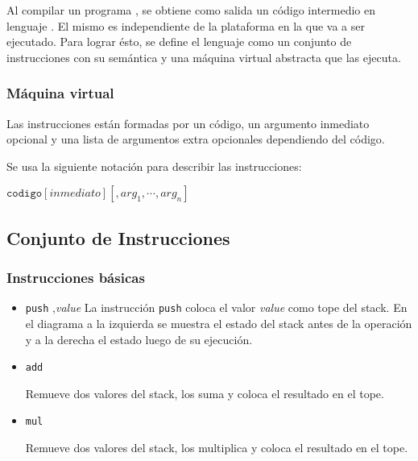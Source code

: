   Al compilar un programa \frob{}, se obtiene como salida un código
intermedio en lenguaje \alf{}.
  El mismo es independiente de la plataforma en la que va a ser ejecutado.
  Para lograr ésto, se define el lenguaje como un conjunto de instrucciones
con su semántica y una máquina virtual abstracta que las ejecuta.



\subsubsection{Máquina virtual}



  Las instrucciones están formadas por un código, un argumento inmediato
  opcional y una lista de argumentos extra opcionales dependiendo del
  código.

  Se usa la siguiente notación para describir las instrucciones:
  \begin{center}
    $\texttt{codigo} [\textit{inmediato}] [, {arg}_1, \dotsb, {arg}_n ]$
  \end{center}


\subsection{Conjunto de Instrucciones}

\subsubsection{Instrucciones básicas}

\begin{itemize}

\item {
    \texttt{push} ,\textit{value}
    La instrucción \texttt{push} coloca el
    valor \textit{value} como tope del stack.
    En el diagrama a la izquierda se muestra el estado del stack antes
    de la operación y a la derecha el estado luego de su ejecución.

    
}
\item {
    \texttt{add}

      Remueve dos valores del stack, los suma y coloca el resultado en
    el tope.

    
}
\item {
    \texttt{mul}

      Remueve dos valores del stack, los multiplica y coloca el resultado en
    el tope.

    
}
\end{itemize}

